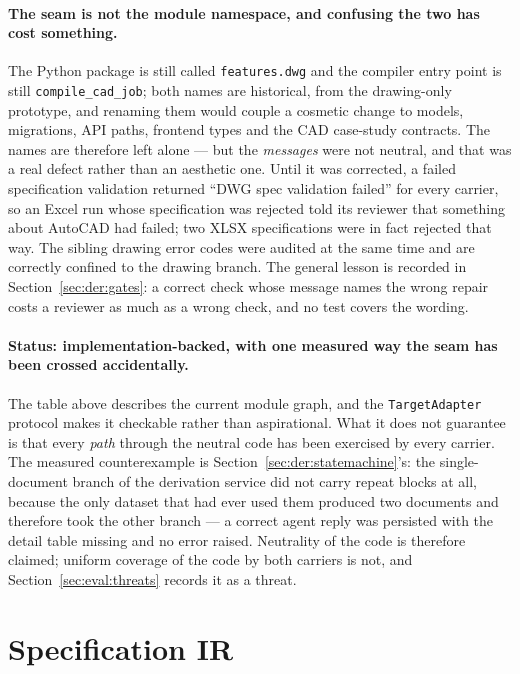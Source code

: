 {\sloppy
\paragraph{The seam is not the module namespace, and confusing the two has cost something.}
The Python package is still called \texttt{features.dwg} and the compiler entry point is
still \texttt{compile\_cad\_job}; both names are historical, from the drawing-only
prototype, and renaming them would couple a cosmetic change to models, migrations, API
paths, frontend types and the CAD case-study contracts. The names are therefore left alone
--- but the \emph{messages} were not neutral, and that was a real defect rather than an
aesthetic one. Until it was corrected, a failed specification validation returned
``DWG spec validation failed'' for every carrier, so an Excel run whose specification was
rejected told its reviewer that something about AutoCAD had failed; two XLSX
specifications were in fact rejected that way. The sibling drawing error codes were audited
at the same time and are correctly confined to the drawing branch. The general lesson is
recorded in Section~\ref{sec:der:gates}: a correct check whose message names the wrong
repair costs a reviewer as much as a wrong check, and no test covers the wording.

\par}

\paragraph{Status: implementation-backed, with one measured way the seam has been crossed
accidentally.}
The table above describes the current module graph, and the \texttt{TargetAdapter} protocol
makes it checkable rather than aspirational. What it does not guarantee is that every
\emph{path} through the neutral code has been exercised by every carrier. The measured
counterexample is Section~\ref{sec:der:statemachine}'s: the single-document branch of the
derivation service did not carry repeat blocks at all, because the only dataset that had
ever used them produced two documents and therefore took the other branch --- a correct
agent reply was persisted with the detail table missing and no error raised. Neutrality of
the code is therefore claimed; uniform coverage of the code by both carriers is not, and
Section~\ref{sec:eval:threats} records it as a threat.

\section{Specification IR}
\label{sec:design:ir}


